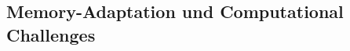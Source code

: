 \documentclass[11pt,a4paper]{article}
\begin{document}
    \subsection{Memory-Adaptation und Computational Challenges}
\end{document}
